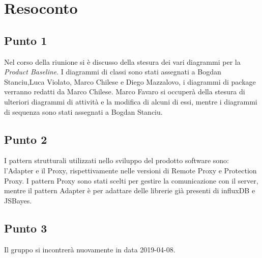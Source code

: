 \section{Resoconto}

\subsection{Punto 1}
Nel corso della riunione si è discusso della stesura dei vari diagrammi per la \textit{Product Baseline}. I diagrammi di classi sono stati assegnati a Bogdan Stanciu,Luca Violato, Marco Chilese e Diego Mazzalovo, i diagrammi di package verranno redatti da Marco Chilese.
Marco Favaro si occuperà della stesura di ulteriori diagrammi di attività e la modifica di alcuni di essi, mentre i diagrammi di sequenza sono stati assegnati a Bogdan Stanciu.

\subsection{Punto 2}
I pattern  strutturali utilizzati nello sviluppo del prodotto software sono: l'Adapter e il Proxy, rispettivamente nelle versioni di Remote Proxy e Protection Proxy. 
I pattern Proxy sono stati scelti per gestire la comunicazione con il server, mentre il pattern Adapter è per adattare delle librerie già presenti di influxDB e JSBayes.  
	
\subsection{Punto 3}
Il gruppo si incontrerà nuovamente in data 2019-04-08.